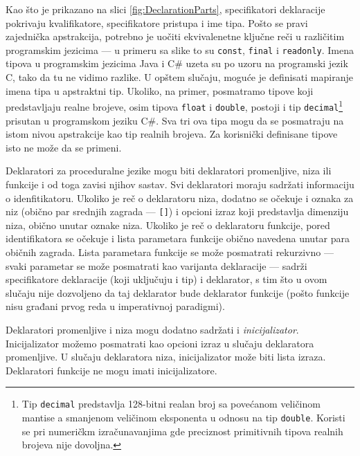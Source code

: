 Kao što je prikazano na slici \ref{fig:DeclarationParts}, specifikatori deklaracije pokrivaju kvalifikatore, specifikatore pristupa i ime tipa. Pošto se pravi zajednička apstrakcija, potrebno je uočiti ekvivalenetne ključne reči u različitim programskim jezicima --- u primeru sa slike to su \texttt{const}, \texttt{final} i \texttt{readonly}. Imena tipova u programskim jezicima Java i C\# uzeta su po uzoru na programski jezik C, tako da tu ne vidimo razlike. U opštem slučaju, moguće je definisati mapiranje imena tipa u apstraktni tip. Ukoliko, na primer, posmatramo tipove koji predstavljaju realne brojeve, osim tipova \texttt{float} i \texttt{double}, postoji i tip \texttt{decimal}\footnote{Tip \texttt{decimal} predstavlja 128-bitni realan broj sa povećanom veličinom mantise a smanjenom veličinom eksponenta u odnosu na tip \texttt{double}. Koristi se pri numeričkm izračunavanjima gde preciznost primitivnih tipova realnih brojeva nije dovoljna.} prisutan u programskom jeziku C\#. Sva tri ova tipa mogu da se posmatraju na istom nivou apstrakcije kao tip realnih brojeva. Za korisnički definisane tipove isto ne može da se primeni.

Deklaratori za proceduralne jezike mogu biti deklaratori promenljive, niza ili funkcije i od toga zavisi njihov sastav. Svi deklaratori moraju sadržati informaciju o idenfitikatoru. Ukoliko je reč o deklaratoru niza, dodatno se očekuje i oznaka za niz (obično par srednjih zagrada --- \texttt{[]}) i opcioni izraz koji predstavlja dimenziju niza, obično unutar oznake niza. Ukoliko je reč o deklaratoru funkcije, pored identifikatora se očekuje i lista parametara funkcije obično navedena unutar para običnih zagrada. Lista parametara funkcije se može posmatrati rekurzivno --- svaki parametar se može posmatrati kao varijanta deklaracije --- sadrži specifikatore deklaracije (koji uključuju i tip) i deklarator, s tim što u ovom slučaju nije dozvoljeno da taj deklarator bude deklarator funkcije (pošto funkcije nisu građani prvog reda u imperativnoj paradigmi). 

Deklaratori promenljive i niza mogu dodatno sadržati i \emph{inicijalizator}. Inicijalizator možemo posmatrati kao opcioni izraz u slučaju deklaratora promenljive. U slučaju deklaratora niza, inicijalizator može biti lista izraza. Deklaratori funkcije ne mogu imati inicijalizatore.


